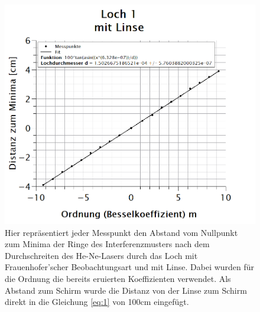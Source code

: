 \begin{figure}[h]
\centering
\includegraphics[width=\textwidth]{Bilder/loch1_mitLinse.png}  
\caption[Loch 1: mit Linse]{Hier repräsentiert jeder Messpunkt den Abstand vom Nullpunkt zum Minima der Ringe des Interferenzmusters nach dem Durchschreiten des He-Ne-Lasers durch das Loch mit Frauenhofer'scher Beobachtungsart und mit Linse. Dabei wurden für die Ordnung die bereits eruierten Koeffizienten verwendet. Als Abstand zum Schirm wurde die Distanz von der Linse zum Schirm direkt in die Gleichung \ref{eq:1} von 100cm eingefügt.}
\label{fig:loch1_mitLinse}
\end{figure}
\newpage

